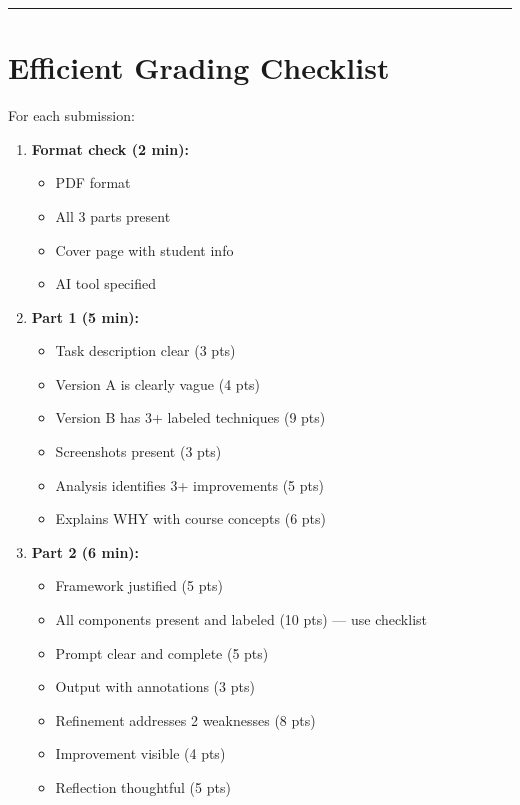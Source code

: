 \documentclass[11pt]{article}
\begin{document}
\hrule
\vspace{0.5cm}

\section{Efficient Grading Checklist}

For each submission:

\begin{enumerate}
    \item \textbf{Format check (2 min):}
    \begin{itemize}
        \item[$\square$] PDF format
        \item[$\square$] All 3 parts present
        \item[$\square$] Cover page with student info
        \item[$\square$] AI tool specified
    \end{itemize}
    
    \item \textbf{Part 1 (5 min):}
    \begin{itemize}
        \item[$\square$] Task description clear (3 pts)
        \item[$\square$] Version A is clearly vague (4 pts)
        \item[$\square$] Version B has 3+ labeled techniques (9 pts)
        \item[$\square$] Screenshots present (3 pts)
        \item[$\square$] Analysis identifies 3+ improvements (5 pts)
        \item[$\square$] Explains WHY with course concepts (6 pts)
    \end{itemize}
    
    \item \textbf{Part 2 (6 min):}
    \begin{itemize}
        \item[$\square$] Framework justified (5 pts)
        \item[$\square$] All components present and labeled (10 pts) --- use checklist
        \item[$\square$] Prompt clear and complete (5 pts)
        \item[$\square$] Output with annotations (3 pts)
        \item[$\square$] Refinement addresses 2 weaknesses (8 pts)
        \item[$\square$] Improvement visible (4 pts)
        \item[$\square$] Reflection thoughtful (5 pts)
    \end{itemize}
    

\end{enumerate}
\end{document}
